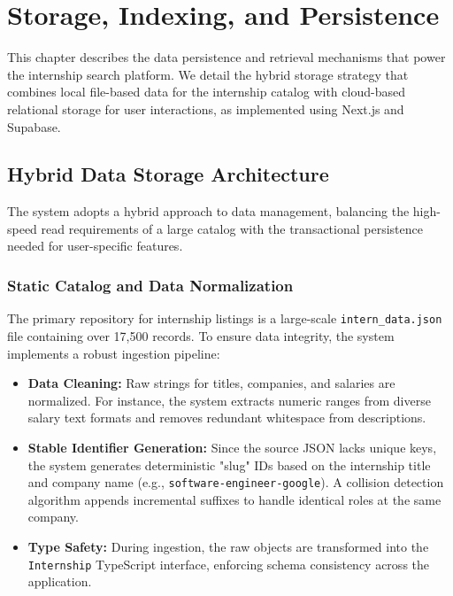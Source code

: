 \chapter{Storage, Indexing, and Persistence}
This chapter describes the data persistence and retrieval mechanisms that power the internship search platform. We detail the hybrid storage strategy that combines local file-based data for the internship catalog with cloud-based relational storage for user interactions, as implemented using Next.js and Supabase.

\section{Hybrid Data Storage Architecture}
The system adopts a hybrid approach to data management, balancing the high-speed read requirements of a large catalog with the transactional persistence needed for user-specific features.

\subsection{Static Catalog and Data Normalization}
The primary repository for internship listings is a large-scale \texttt{intern\_data.json} file containing over 17,500 records. To ensure data integrity, the system implements a robust ingestion pipeline:
\begin{itemize}
    \item \textbf{Data Cleaning:} Raw strings for titles, companies, and salaries are normalized. For instance, the system extracts numeric ranges from diverse salary text formats and removes redundant whitespace from descriptions.
    \item \textbf{Stable Identifier Generation:} Since the source JSON lacks unique keys, the system generates deterministic "slug" IDs based on the internship title and company name (e.g., \texttt{software-engineer-google}). A collision detection algorithm appends incremental suffixes to handle identical roles at the same company.
    \item \textbf{Type Safety:} During ingestion, the raw objects are transformed into the \texttt{Internship} TypeScript interface, enforcing schema consistency across the application.
\end{itemize}

